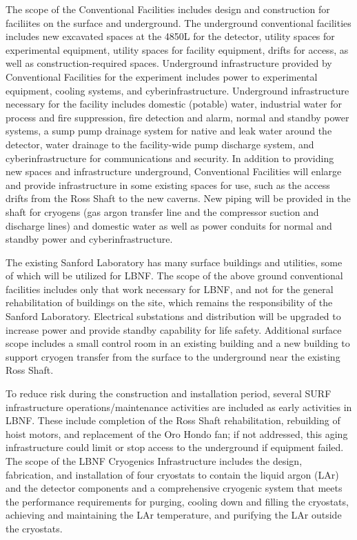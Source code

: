 The scope of the Conventional Facilities includes design and construction for faciliites on the surface and underground. The underground conventional facilities includes new excavated spaces at the 4850L for the detector, utility spaces for experimental equipment, utility spaces for facility equipment, drifts for access, as well as construction-required spaces. Underground infrastructure provided by Conventional Facilities for the experiment includes power to experimental equipment, cooling systems, and cyberinfrastructure. Underground infrastructure necessary for the facility includes domestic (potable) water, industrial water for process and fire suppression, fire detection and alarm, normal and standby power systems, a sump pump drainage system for native and leak water around the detector, water drainage to the facility-wide pump discharge system, and cyberinfrastructure for communications and security.
In addition to providing new spaces and infrastructure underground, Conventional Facilities will enlarge and provide infrastructure in some existing spaces for use, such as the access drifts from the Ross Shaft to the new caverns. New piping will be provided in the shaft for cryogens (gas argon transfer line and the compressor suction and discharge lines) and domestic water as well as power conduits for normal and standby power and cyberinfrastructure. 

The existing Sanford Laboratory has many surface buildings and utilities, some of which will be utilized for LBNF. The scope of the above ground conventional facilities includes only that work necessary for LBNF, and not for the general rehabilitation of buildings on the site, which remains the responsibility of the Sanford Laboratory. Electrical substations and distribution will be upgraded to increase power and provide standby capability for life safety. Additional surface scope includes a small control room in an existing building and a new building to support cryogen transfer from the surface to the underground near the existing Ross Shaft.

To reduce risk during the construction and installation period, several SURF infrastructure operations/maintenance activities are included as early activities in LBNF. These include completion of the Ross Shaft rehabilitation, rebuilding of hoist motors, and replacement of the Oro Hondo fan; if not addressed, this aging infrastructure could limit or stop access to the underground if equipment failed. 
The scope of the LBNF Cryogenics Infrastructure includes the design, fabrication, and installation of four cryostats to contain the liquid argon (LAr) and the detector components and a comprehensive cryogenic system that meets the performance requirements for purging, cooling down and filling the cryostats, achieving and maintaining the LAr temperature, and purifying the LAr outside the cryostats. 

